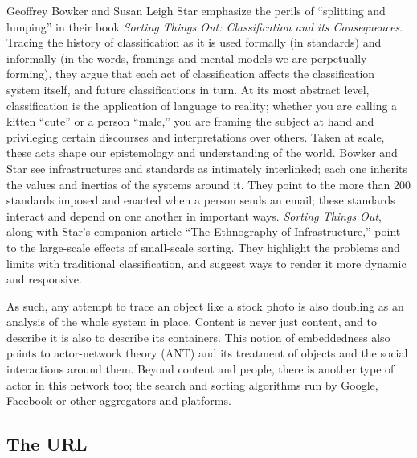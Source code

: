 Geoffrey Bowker and Susan Leigh Star emphasize the perils of ``splitting and lumping'' in their book \emph{Sorting Things Out: Classification and its Consequences}. Tracing the history of classification as it is used formally (in standards) and informally (in the words, framings and mental models we are perpetually forming), they argue that each act of classification affects the classification system itself, and future classifications in turn. At its most abstract level, classification is the application of language to reality; whether you are calling a kitten ``cute'' or a person ``male,'' you are framing the subject at hand and privileging certain discourses and interpretations over others. Taken at scale, these acts shape our epistemology and understanding of the world. Bowker and Star see infrastructures and standards as intimately interlinked; each one inherits the values and inertias of the systems around it. They point to the more than 200 standards imposed and enacted when a person sends an email; these standards interact and depend on one another in important ways.\autocite[7]{bowker_sorting_2000} \emph{Sorting Things Out}, along with Star's companion article ``The Ethnography of Infrastructure,'' point to the large-scale effects of small-scale sorting.\autocite{star_ethnography_1999} They highlight the problems and limits with traditional classification, and suggest ways to render it more dynamic and responsive.

As such, any attempt to trace an object like a stock photo is also doubling as an analysis of the whole system in place. Content is never just content, and to describe it is also to describe its containers. This notion of embeddedness also points to actor-network theory (ANT) and its treatment of objects and the social interactions around them. Beyond content and people, there is another type of actor in this network too; the search and sorting algorithms run by Google, Facebook or other aggregators and platforms.

\subsection{The URL}


